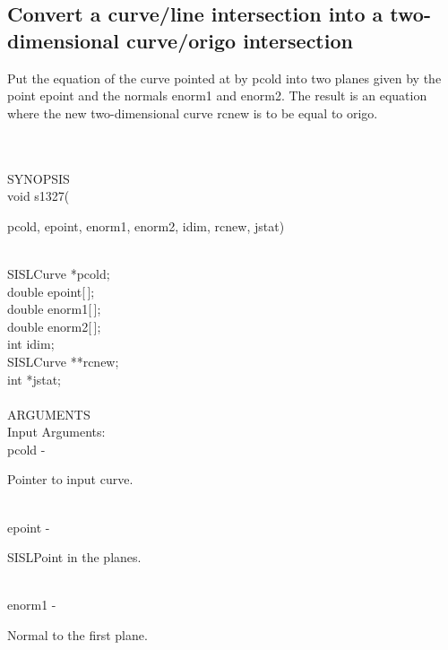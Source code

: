 \subsection{Convert a curve/line intersection into a two-dimensional curve/origo intersection}

\begin{minipg1}
Put the equation of the curve pointed at by pcold
               into two planes given by the point epoint and the normals
               enorm1 and enorm2. The result is an equation where the
               new two-dimensional curve rcnew is to be equal to origo.
\end{minipg1} \\ \\
SYNOPSIS\\
        \> void s1327(\begin{minipg3}
            {\fov pcold}, {\fov epoint}, {\fov enorm1}, {\fov enorm2}, {\fov idim}, {\fov rcnew}, {\fov jstat})
                \end{minipg3}\\
                \>\>    SISLCurve    \>  *{\fov pcold};\\
                \>\>    double       \> epoint[\,];\\
                \>\>    double       \> enorm1[\,];\\
                \>\>    double       \> enorm2[\,];\\
                \>\>    int    \>  {\fov idim};\\
                \>\>    SISLCurve    \>  **{\fov rcnew};\\
                \>\>    int    \>  *{\fov jstat};\\
\\
ARGUMENTS\\
	\>Input Arguments:\\
        \>\>    {\fov pcold}\> - \>  \begin{minipg2}
                     Pointer to input curve.
                               \end{minipg2}\\
        \>\>    {\fov epoint}\> - \>  \begin{minipg2}
                     SISLPoint in the planes.
                               \end{minipg2}\\
        \>\>    {\fov enorm1}\> - \>  \begin{minipg2}
                     Normal to the first plane.
                               \end{minipg2}\\
